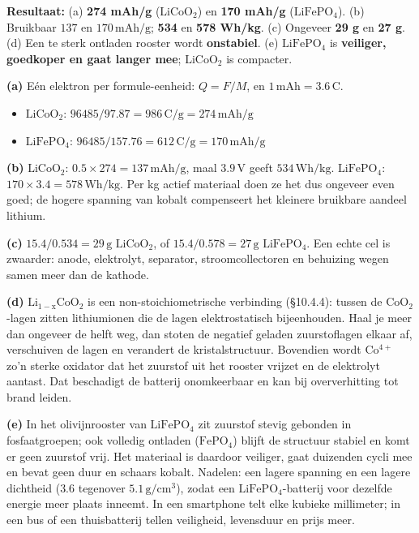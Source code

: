\begin{oplossing}
\textbf{Resultaat:} (a) \textbf{274 mAh/g} (\(\mathrm{LiCoO_2}\)) en \textbf{170 mAh/g} (\(\mathrm{LiFePO_4}\)). (b) Bruikbaar \(137\) en \(170\,\mathrm{mAh/g}\); \textbf{534} en \textbf{578 Wh/kg}. (c) Ongeveer \textbf{29 g} en \textbf{27 g}. (d) Een te sterk ontladen rooster wordt \textbf{onstabiel}. (e) \(\mathrm{LiFePO_4}\) is \textbf{veiliger, goedkoper en gaat langer mee}; \(\mathrm{LiCoO_2}\) is compacter.

\textbf{(a)} Eén elektron per formule-eenheid: \(Q = F/M\), en \(1\,\mathrm{mAh} = 3.6\,\mathrm{C}\).

\begin{itemize}
\item
  \(\mathrm{LiCoO_2}\): \(96485/97.87 = 986\,\mathrm{C/g} = 274\,\mathrm{mAh/g}\)
\item
  \(\mathrm{LiFePO_4}\): \(96485/157.76 = 612\,\mathrm{C/g} = 170\,\mathrm{mAh/g}\)
\end{itemize}

\textbf{(b)} \(\mathrm{LiCoO_2}\): \(0.5 \times 274 = 137\,\mathrm{mAh/g}\), maal \(3.9\,\mathrm{V}\) geeft \(534\,\mathrm{Wh/kg}\). \(\mathrm{LiFePO_4}\): \(170 \times 3.4 = 578\,\mathrm{Wh/kg}\). Per kg actief materiaal doen ze het dus ongeveer even goed; de hogere spanning van kobalt compenseert het kleinere bruikbare aandeel lithium.

\textbf{(c)} \(15.4/0.534 = 29\,\mathrm{g}\) \(\mathrm{LiCoO_2}\), of \(15.4/0.578 = 27\,\mathrm{g}\) \(\mathrm{LiFePO_4}\). Een echte cel is zwaarder: anode, elektrolyt, separator, stroomcollectoren en behuizing wegen samen meer dan de kathode.

\textbf{(d)} \(\mathrm{Li_{1-x}CoO_2}\) is een non-stoichiometrische verbinding (§10.4.4): tussen de \(\mathrm{CoO_2}\)-lagen zitten lithiumionen die de lagen elektrostatisch bijeenhouden. Haal je meer dan ongeveer de helft weg, dan stoten de negatief geladen zuurstoflagen elkaar af, verschuiven de lagen en verandert de kristalstructuur. Bovendien wordt \(\mathrm{Co^{4+}}\) zo'n sterke oxidator dat het zuurstof uit het rooster vrijzet en de elektrolyt aantast. Dat beschadigt de batterij onomkeerbaar en kan bij oververhitting tot brand leiden.

\textbf{(e)} In het olivijnrooster van \(\mathrm{LiFePO_4}\) zit zuurstof stevig gebonden in fosfaatgroepen; ook volledig ontladen (\(\mathrm{FePO_4}\)) blijft de structuur stabiel en komt er geen zuurstof vrij. Het materiaal is daardoor veiliger, gaat duizenden cycli mee en bevat geen duur en schaars kobalt. Nadelen: een lagere spanning en een lagere dichtheid (\(3.6\) tegenover \(5.1\,\mathrm{g/cm^3}\)), zodat een \(\mathrm{LiFePO_4}\)-batterij voor dezelfde energie meer plaats inneemt. In een smartphone telt elke kubieke millimeter; in een bus of een thuisbatterij tellen veiligheid, levensduur en prijs meer.
\end{oplossing}

